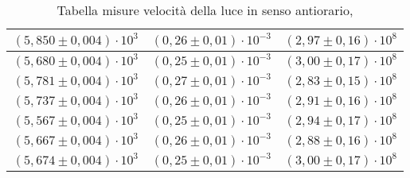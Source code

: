 \begin{table}[H]
\begin{tabular}{|c|c|c|}
        $ (5,850 \pm 0,004) \cdot 10^{3} $ & $ (0,26 \pm 0,01) \cdot 10^{-3} $ & $ (2,97 \pm 0,16) \cdot 10^{8} $\\
        \hline
        $ (5,680 \pm 0,004) \cdot 10^{3} $ & $ (0,25 \pm 0,01) \cdot 10^{-3} $ & $ (3,00 \pm 0,17) \cdot 10^{8} $\\
        \hline
        $ (5,781 \pm 0,004) \cdot 10^{3} $ & $ (0,27 \pm 0,01) \cdot 10^{-3} $ & $ (2,83 \pm 0,15) \cdot 10^{8} $\\
        \hline
        $ (5,737 \pm 0,004) \cdot 10^{3} $ & $ (0,26 \pm 0,01) \cdot 10^{-3} $ & $ (2,91 \pm 0,16) \cdot 10^{8} $\\
        \hline
        $ (5,567 \pm 0,004) \cdot 10^{3} $ & $ (0,25 \pm 0,01) \cdot 10^{-3} $ & $ (2,94 \pm 0,17) \cdot 10^{8} $\\
        \hline
        $ (5,667 \pm 0,004) \cdot 10^{3} $ & $ (0,26 \pm 0,01) \cdot 10^{-3} $ & $ (2,88 \pm 0,16) \cdot 10^{8} $\\
        \hline
        $ (5,674 \pm 0,004) \cdot 10^{3} $ & $ (0,25 \pm 0,01) \cdot 10^{-3} $ & $ (3,00 \pm 0,17) \cdot 10^{8} $\\
        \hline
        \end{tabular}
    \caption{Tabella misure velocità della luce in senso antiorario,}
\end{table}
